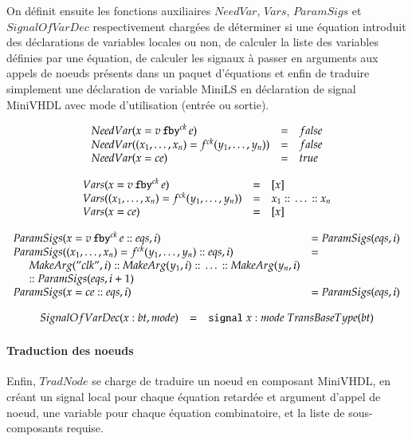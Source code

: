 \documentclass[9pt,a4paper]{article}
\newcommand{\mybox}[1]{\mbox{\tt{#1}}}
\newcommand{\ind}[0]{\hspace{0.5cm}}
\newcommand{\Cons}[0]{\; \mathbf{::} \;}
\newcommand{\Fby}[2]{#1 \, \mybox{fby}^{ck} \, #2}
\newcommand{\App}[2]{#1^{ck}(#2)}
\begin{document}
On définit ensuite les fonctions auxiliaires $NeedVar$, $Vars$, $ParamSigs$ et
$SignalOfVarDec$ respectivement chargées de déterminer si une équation introduit
des déclarations de variables locales ou non, de calculer la liste des variables
définies par une équation, de calculer les signaux à passer en arguments aux
appels de noeuds présents dans un paquet d'équations et enfin de traduire
simplement une déclaration de variable MiniLS en déclaration de signal MiniVHDL
avec mode d'utilisation (entrée ou sortie).

\newcommand{\NV}[1]{NeedVar(#1)}
\newcommand{\V}[1]{Vars(#1)}
\newcommand{\PS}[2]{ParamSigs(#1,#2)}
\newcommand{\SoVD}[3]{SignalOfVarDec(#1 : #2, #3)}

\[
\begin{array}{lcl}
  \NV{x = \Fby{v}{e}} & = & false \\
  \NV{(x_1,\dots,x_n) = \App{f}{y_1,\dots,y_n}} & = & false \\
  \NV{x = ce} & = & true
\end{array}
\]

\[
\begin{array}{lcl}
  \V{x = \Fby{v}{e}} & = & [x] \\
  \V{(x_1,\dots,x_n) = \App{f}{y_1,\dots,y_n}} & = & x_1 \Cons \dots \Cons x_n \\
  \V{x = ce} & = & [x]
\end{array}
\]

\[
\begin{array}{ll}
  \PS{x = \Fby{v}{e} \Cons eqs}{i} & = \PS{eqs}{i} \\
  \PS{(x_1,\dots,x_n) = \App{f}{y_1,\dots,y_n} \Cons eqs}{i} & = \\
  \ind \MA{"clk"}{i} \Cons \MA{y_1}{i} \Cons \dots \Cons \MA{y_n}{i} \\
  \ind \mathtt{::} \; \PS{eqs}{i + 1}
  \\
  \PS{x = ce \Cons eqs}{i} & = \PS{eqs}{i}
\end{array}
\]

\[
\begin{array}[lcl]{lcl}
  \SoVD{x}{bt}{mode} & = & \mybox{signal} \; x : mode \; TransBaseType(bt)
\end{array}
\]

\paragraph{Traduction des noeuds}

Enfin, $TradNode$ se charge de traduire un noeud en composant MiniVHDL, en
créant un signal local pour chaque équation retardée et argument d'appel de
noeud, une variable pour chaque équation combinatoire, et la liste de
sous-composants requise.
\end{document}
